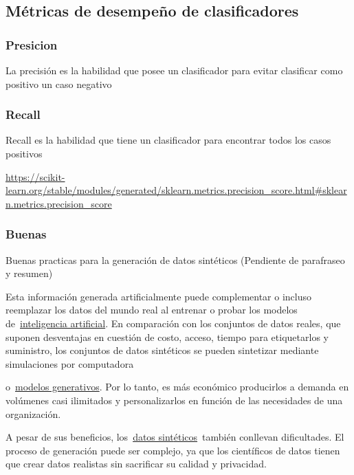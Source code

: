 \documentclass{article}
\begin{document}
\subsection{Métricas de desempeño de clasificadores}

\subsubsection{Presicion}

La precisi{\'{o}}n es la habilidad que posee un clasificador para evitar clasificar como positivo un caso negativo

\subsubsection{Recall}

Recall es la habilidad que tiene un clasificador para encontrar todos los casos positivos

\url{https://scikit-learn.org/stable/modules/generated/sklearn.metrics.precision_score.html\#sklearn.metrics.precision_score}

\subsubsection{Buenas }

Buenas practicas para la generaci{\'{o}}n de datos sint{\'{e}}ticos (Pendiente de parafraseo y resumen)

Esta informaci{\'{o}}n generada artificialmente puede complementar o incluso reemplazar los datos del mundo real al entrenar o probar los modelos de~\href{https://www.ibm.com/mx-es/think/topics/artificial-intelligence}{inteligencia artificial}. En comparaci{\'{o}}n con los conjuntos de datos reales, que suponen desventajas en cuesti{\'{o}}n de costo, acceso, tiempo para etiquetarlos y suministro, los conjuntos de datos sint{\'{e}}ticos se pueden sintetizar mediante simulaciones por computadora 

o~\href{https://www.ibm.com/mx-es/think/topics/generative-model}{modelos generativos}. Por lo tanto, es m{\'{a}}s econ{\'{o}}mico producirlos a demanda en vol{{\'{u}}}menes casi ilimitados y personalizarlos en funci{\'{o}}n de las necesidades de una organizaci{\'{o}}n.

A pesar de sus beneficios, los~\href{https://research.ibm.com/blog/what-is-synthetic-data}{datos sint{\'{e}}ticos}~tambi{\'{e}}n conllevan dificultades. El proceso de generaci{\'{o}}n puede ser complejo, ya que los cient{\'{i}}ficos de datos tienen que crear datos realistas sin sacrificar su calidad y privacidad.
\end{document}
